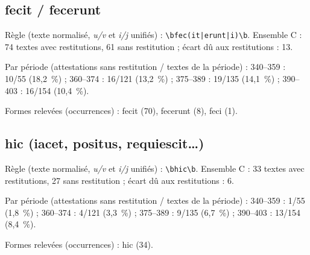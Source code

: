 \subsection*{fecit / fecerunt}
\noindent Règle (texte normalisé, \textit{u/v} et \textit{i/j} unifiés) : \texttt{\small \textbackslash{}bfec(\allowbreak{}it|\allowbreak{}erunt|\allowbreak{}i)\textbackslash{}b}. Ensemble C : 74 textes avec restitutions, 61 sans restitution ; écart dû aux restitutions : 13.\par
\noindent Par période (attestations sans restitution / textes de la période) : 340–359 : 10/55 (18,2~\%) ; 360–374 : 16/121 (13,2~\%) ; 375–389 : 19/135 (14,1~\%) ; 390–403 : 16/154 (10,4~\%).\par
\noindent Formes relevées (occurrences) : fecit (70), fecerunt (8), feci (1).\par
{}\par\medskip
\subsection*{hic (iacet, positus, requiescit…)}
\noindent Règle (texte normalisé, \textit{u/v} et \textit{i/j} unifiés) : \texttt{\small \textbackslash{}bhic\textbackslash{}b}. Ensemble C : 33 textes avec restitutions, 27 sans restitution ; écart dû aux restitutions : 6.\par
\noindent Par période (attestations sans restitution / textes de la période) : 340–359 : 1/55 (1,8~\%) ; 360–374 : 4/121 (3,3~\%) ; 375–389 : 9/135 (6,7~\%) ; 390–403 : 13/154 (8,4~\%).\par
\noindent Formes relevées (occurrences) : hic (34).\par
{}\par\medskip
